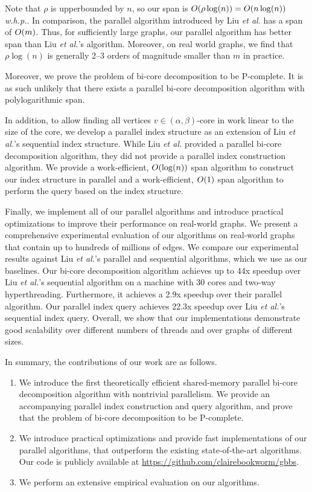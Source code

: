 Note that $\rho$ is upperbounded by $n$, so our span is $O(\rho \log(n)) = O(n \log(n))$ \textit{w.h.p.}. In comparison, the parallel algorithm introduced by Liu \textit{et al.} has a span of $O(m)$. Thus, for sufficiently large graphs, our parallel algorithm has better span than Liu \textit{et al.}'s algorithm. Moreover, on real world graphs, we find that $\rho\log(n)$ is generally 2--3 orders of magnitude smaller than $m$ in practice. 

Moreover, we prove the problem of bi-core decomposition to be P-complete. It is as such unlikely that there exists a parallel bi-core decomposition algorithm with polylogarithmic span.

In addition, to allow finding all vertices $v\in (\alpha,\beta)$-core in work linear to the size of the core, we develop a parallel index structure as an extension of Liu \textit{et al.}'s sequential index structure. While Liu \textit{et al.} provided a parallel bi-core decomposition algorithm, they did not provide a parallel index construction algorithm. We provide a work-efficient, $O(\log(n))$ span algorithm to construct our index structure in parallel and a work-efficient, $O(1)$ span algorithm to perform the query based on the index structure. 

Finally, we implement all of our parallel algorithms and introduce practical optimizations to improve their performance on real-world graphs. We present a comprehensive experimental evaluation of our algorithms on real-world graphs that contain up to hundreds of millions of edges. We compare our experimental results against Liu \textit{et al.}'s parallel and sequential algorithms, which we use as our baselines. Our bi-core decomposition algorithm achieves up to 44x speedup over Liu \textit{et al.}'s sequential algorithm on a machine with 30 cores and two-way hyperthreading. Furthermore, it achieves a 2.9x speedup over their parallel algorithm. Our parallel index query achieves 22.3x speedup over Liu \textit{et al.}'s sequential index query. Overall, we show that our implementations demonstrate good scalability over different numbers of threads and over graphs of different sizes.

In summary, the contributions of our work are as follows.
\begin{enumerate}
\item We introduce the first theoretically efficient shared-memory parallel bi-core decomposition algorithm with nontrivial parallelism. We provide an accompanying parallel index construction and query algorithm, and prove that the problem of bi-core decomposition to be P-complete. 
\item We introduce practical optimizations and provide fast implementations of our parallel algorithms, that outperform the existing state-of-the-art algorithms. Our code is publicly available at \url{https://github.com/clairebookworm/gbbs}.
\item We perform an extensive empirical evaluation on our algorithms.
\end{enumerate}


